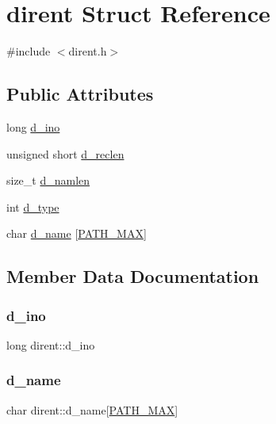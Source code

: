 \hypertarget{structdirent}{}\section{dirent Struct Reference}
\label{structdirent}


{\ttfamily \#include $<$dirent.\+h$>$}

\subsection*{Public Attributes}
\begin{DoxyCompactItemize}
\item 
long \mbox{\hyperlink{structdirent_acb6fecfb0e0f6fdc226dff8d56c3da4a}{d\+\_\+ino}}
\item 
unsigned short \mbox{\hyperlink{structdirent_a90dc47836e8ef510437317876368859e}{d\+\_\+reclen}}
\item 
size\+\_\+t \mbox{\hyperlink{structdirent_a09ced068b03cdb339e34840c8b709621}{d\+\_\+namlen}}
\item 
int \mbox{\hyperlink{structdirent_ad6a736cb04c7295e8f97f708324b3500}{d\+\_\+type}}
\item 
char \mbox{\hyperlink{structdirent_a6c68ac080755453ec52de202e91de59b}{d\+\_\+name}} \mbox{[}\mbox{\hyperlink{dirent_8h_ae688d728e1acdfe5988c7db45d6f0166}{P\+A\+T\+H\+\_\+\+M\+AX}}\mbox{]}
\end{DoxyCompactItemize}


\subsection{Member Data Documentation}
\mbox{\label{structdirent_acb6fecfb0e0f6fdc226dff8d56c3da4a}} 
\subsubsection{\texorpdfstring{d\_ino}{d\_ino}}
{\footnotesize\ttfamily long dirent\+::d\+\_\+ino}

\mbox{\label{structdirent_a6c68ac080755453ec52de202e91de59b}} 
\subsubsection{\texorpdfstring{d\_name}{d\_name}}
{\footnotesize\ttfamily char dirent\+::d\+\_\+name\mbox{[}\mbox{\hyperlink{dirent_8h_ae688d728e1acdfe5988c7db45d6f0166}{P\+A\+T\+H\+\_\+\+M\+AX}}\mbox{]}}

